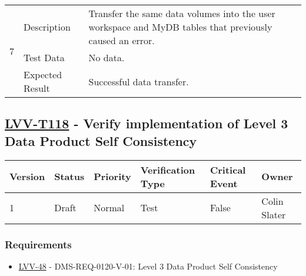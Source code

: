 \begin{longtable}[]{p{1.3cm}p{2cm}p{13cm}}
            \multirow{3}{*}{ 7 } & Description &
            \begin{minipage}[t]{13cm}{\footnotesize
            Transfer the same data volumes into the user workspace and MyDB tables
that previously caused an error.

            \vspace{\dp0}
            } \end{minipage} \\ \cline{2-3}
            & Test Data &
            \begin{minipage}[t]{13cm}{\footnotesize
                No data.
                \vspace{\dp0}
            } \end{minipage} \\ \cline{2-3}
            & Expected Result &
                \begin{minipage}[t]{13cm}{\footnotesize
                Successful data transfer.

                \vspace{\dp0}
                } \end{minipage}
        \\ \midrule
    \end{longtable}

\subsection{\href{https://jira.lsstcorp.org/secure/Tests.jspa\#/testCase/LVV-T118}{LVV-T118}
    - Verify implementation of Level 3 Data Product Self Consistency}\label{lvv-t118}

\begin{longtable}[]{llllll}
\toprule
Version & Status & Priority & Verification Type & Critical Event & Owner
\\\midrule
1 & Draft & Normal &
Test & False & Colin Slater
\\\bottomrule
\end{longtable}

\subsubsection{Requirements}
\begin{itemize}
\item \href{https://jira.lsstcorp.org/browse/LVV-48}{LVV-48} - DMS-REQ-0120-V-01: Level 3 Data Product Self Consistency
\end{itemize}


